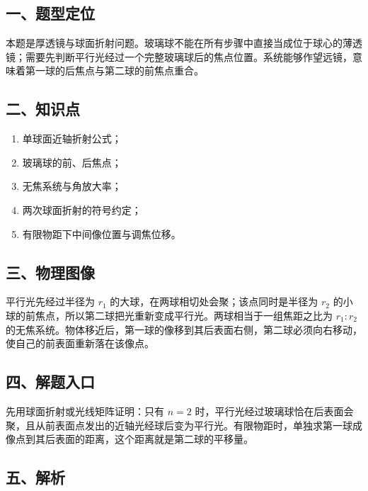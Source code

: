 \documentclass[12pt,a4paper,UTF8]{ctexart}
\newcommand{\tightlist}{\setlength{\itemsep}{0pt}\setlength{\parskip}{0pt}}
\begin{document}
\subsection{一、题型定位}\label{ux4e00ux9898ux578bux5b9aux4f4d-3}

本题是厚透镜与球面折射问题。玻璃球不能在所有步骤中直接当成位于球心的薄透镜；需要先判断平行光经过一个完整玻璃球后的焦点位置。系统能够作望远镜，意味着第一球的后焦点与第二球的前焦点重合。

\subsection{二、知识点}\label{ux4e8cux77e5ux8bc6ux70b9-3}

\begin{enumerate}
\def\labelenumi{\arabic{enumi}.}
\tightlist
\item
  单球面近轴折射公式；
\item
  玻璃球的前、后焦点；
\item
  无焦系统与角放大率；
\item
  两次球面折射的符号约定；
\item
  有限物距下中间像位置与调焦位移。
\end{enumerate}

\subsection{三、物理图像}\label{ux4e09ux7269ux7406ux56feux50cf-3}

平行光先经过半径为 \(r_1\) 的大球，在两球相切处会聚；该点同时是半径为
\(r_2\)
的小球的前焦点，所以第二球把光重新变成平行光。两球相当于一组焦距之比为
\(r_1:r_2\)
的无焦系统。物体移近后，第一球的像移到其后表面右侧，第二球必须向右移动，使自己的前表面重新落在该像点。

\subsection{四、解题入口}\label{ux56dbux89e3ux9898ux5165ux53e3-3}

先用球面折射或光线矩阵证明：只有 \(n=2\)
时，平行光经过玻璃球恰在后表面会聚，且从前表面点发出的近轴光经球后变为平行光。有限物距时，单独求第一球成像点到其后表面的距离，这个距离就是第二球的平移量。

\subsection{五、解析}\label{ux4e94ux89e3ux6790-3}
\end{document}
